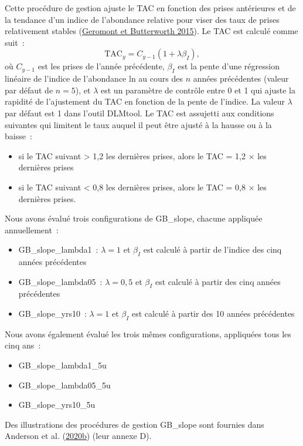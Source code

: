 \documentclass[french,11pt]{book}
\begin{document}
Cette procédure de gestion ajuste le TAC en fonction des prises antérieures et de la tendance d'un indice de l'abondance relative pour viser des taux de prises relativement stables (\protect\hyperlink{ref-geromont2015}{Geromont et Butterworth 2015}). Le TAC est calculé comme suit~:
\begin{equation}
\textrm{TAC}_y= C_{y-1}(1+\lambda \beta_I),
\end{equation}
où \(C_{y-1}\) est les prises de l'année précédente, \(\beta_I\) est la pente d'une régression linéaire de l'indice de l'abondance ln au cours des \(n\) années précédentes (valeur par défaut de \(n = 5\)), et \(\lambda\) est un paramètre de contrôle entre 0 et 1 qui ajuste la rapidité de l'ajustement du TAC en fonction de la pente de l'indice. La valeur \(\lambda\) par défaut est 1 dans l'outil DLMtool. Le TAC est assujetti aux conditions suivantes qui limitent le taux auquel il peut être ajusté à la hausse ou à la baisse~:
\begin{itemize}

\item
  si le TAC suivant \textgreater{} 1,2 les dernières prises, alors le TAC = 1,2 \(\times\) les dernières prises
\item
  si le TAC suivant \textless{} 0,8 les dernières prises, alors le TAC = 0,8 \(\times\) les dernières prises.
\end{itemize}
Nous avons évalué trois configurations de GB\_slope, chacune appliquée annuellement~:
\begin{itemize}
\item
  GB\_slope\_lambda1~: \(\lambda = 1\) et \(\beta_I\) est calculé à partir de l'indice des cinq années précédentes
\item
  GB\_slope\_lambda05~: \(\lambda = 0,5\) et \(\beta_I\) est calculé à partir des cinq années précédentes
\item
  GB\_slope\_yrs10~: \(\lambda = 1\) et \(\beta_I\) est calculé à partir des 10 années précédentes
\end{itemize}
Nous avons également évalué les trois mêmes configurations, appliquées tous les cinq ans~:
\begin{itemize}
\item
  GB\_slope\_lambda1\_5u
\item
  GB\_slope\_lambda05\_5u
\item
  GB\_slope\_yrs10\_5u
\end{itemize}
Des illustrations des procédures de gestion GB\_slope sont fournies dans Anderson et al. (\protect\hyperlink{ref-anderson2020gfmp}{2020b}) (leur annexe D).
\end{document}
